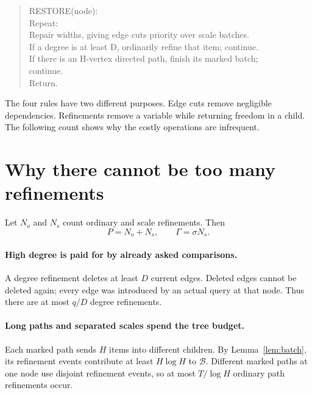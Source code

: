\begin{quote}\ttfamily\small
RESTORE(node):\\
\hspace*{1em}Repeat:\\
\hspace*{2em}Repair widths, giving edge cuts priority over scale batches.\\
\hspace*{2em}If a degree is at least D, ordinarily refine that item; continue.\\
\hspace*{2em}If there is an H-vertex directed path, finish its marked batch;\\
\hspace*{3em}continue.\\
\hspace*{2em}Return.
\end{quote}

The four rules have two different purposes. Edge cuts remove negligible dependencies. Refinements remove a variable while returning freedom in a child. The following count shows why the costly operations are infrequent.

\section{Why there cannot be too many refinements}\label{sec:rarity}

Let \(N_o\) and \(N_s\) count ordinary and scale refinements. Then
\[
P=N_o+N_s,\qquad\Gamma=\sigma N_s.
\]

\paragraph{High degree is paid for by already asked comparisons.}
A degree refinement deletes at least \(D\) current edges. Deleted edges cannot be deleted again; every edge was introduced by an actual query at that node. Thus there are at most \(q/D\) degree refinements.

\paragraph{Long paths and separated scales spend the tree budget.}
Each marked path sends \(H\) items into different children. By Lemma~\ref{lem:batch}, its refinement events contribute at least \(H\log H\) to \(\mathcal B\). Different marked paths at one node use disjoint refinement events, so at most \(T/\log H\) ordinary path refinements occur.

